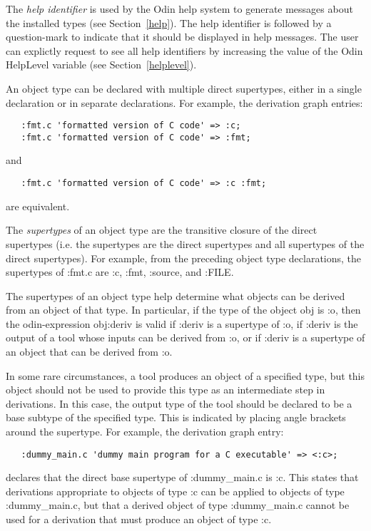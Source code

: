 The {\em help identifier} is used by the Odin help system to generate
messages about the installed types (see Section~\ref{help}).
The help identifier is followed by a question-mark to indicate that
it should be displayed in help messages.
The user can explictly request to see all help identifiers
by increasing the value of the Odin {\ex HelpLevel} variable
(see Section~\ref{helplevel}).

An object type can be declared with multiple direct supertypes,
either in a single declaration or in separate declarations.
For example, the derivation graph entries:
\begin{verbatim}
   :fmt.c 'formatted version of C code' => :c;
   :fmt.c 'formatted version of C code' => :fmt;
\end{verbatim}
and
\begin{verbatim}
   :fmt.c 'formatted version of C code' => :c :fmt;
\end{verbatim}
are equivalent.

The {\em supertypes} of an object type are
the transitive closure of the direct supertypes
(i.e. the supertypes are the direct supertypes
and all supertypes of the direct supertypes).
For example, from the preceding object type declarations,
the supertypes of {\ex :fmt.c} are {\ex :c}, {\ex :fmt},
{\ex :source}, and {\ex :FILE}.

The supertypes of an object type help determine what objects
can be derived from an object of that type.
In particular, if the type of the object {\ex obj} is {\ex :o},
then the odin-expression {\ex obj:deriv} is valid
if {\ex :deriv} is a supertype of {\ex :o},
if {\ex :deriv} is the output of a tool
whose inputs can be derived from {\ex :o},
or if {\ex :deriv} is a supertype of an object
that can be derived from {\ex :o}.

In some rare circumstances, a tool produces an object of a specified type,
but this object should not be used to provide this type as an intermediate
step in derivations.
In this case, the output type of the tool should be declared to be
a {\ex base subtype} of the specified type.
This is indicated by placing angle brackets around the supertype.
For example, the derivation graph entry:
\begin{verbatim}
   :dummy_main.c 'dummy main program for a C executable' => <:c>;
\end{verbatim}
declares that the direct base supertype of {\ex :dummy\_main.c} is {\ex :c}.
This states that derivations appropriate to objects of type
{\ex :c} can be applied to objects of type {\ex :dummy\_main.c},
but that a derived object of type {\ex :dummy\_main.c} cannot be used
for a derivation that must produce an object of type {\ex :c}.


